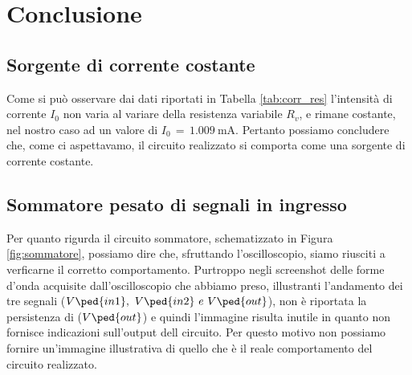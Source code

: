 \section*{Conclusione}

\subsection*{Sorgente di corrente costante}

Come si può osservare dai dati riportati in Tabella \ref{tab:corr_res} l'intensità di corrente $I_0$ non varia al variare della resistenza variabile $R_v$, e rimane costante, nel nostro caso ad un valore di $I_0\,=\,\SI{1.009}{\milli\ampere}$. Pertanto possiamo concludere che, come ci aspettavamo, il circuito realizzato si comporta come una sorgente di corrente costante.

\subsection*{Sommatore pesato di segnali in ingresso}

Per quanto rigurda il circuito sommatore, schematizzato in Figura \ref{fig:sommatore}, possiamo dire che, sfruttando l'oscilloscopio, siamo riusciti a verficarne il corretto comportamento.
Purtroppo negli screenshot delle forme d'onda acquisite dall'oscilloscopio che abbiamo preso, illustranti l'andamento dei tre segnali ($V\ped{in1},\,\,V\ped{in2}\,\,e\,\,V\ped{out}$), non è riportata la persistenza di ($V\ped{out}$) e quindi l'immagine risulta inutile in quanto non fornisce indicazioni sull'output dell circuito. Per questo motivo non possiamo fornire un'immagine illustrativa di quello che è il reale comportamento del circuito realizzato.